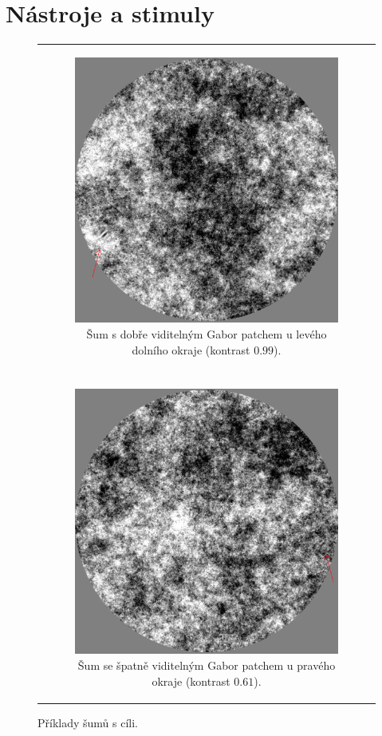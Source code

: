 \section{Nástroje a stimuly}
\begin{figure}
\centering
\begin{tabular}{c}
\begin{subfigure}{0.95\textwidth}
\centering
\includegraphics[width = .75\linewidth]{img/noise_visible}
\caption{Šum s dobře viditelným Gabor patchem u levého dolního okraje (kontrast $0.99$).}
\end{subfigure}\\
\noalign{\vskip\bigskipamount}
\\
\begin{subfigure}{0.95\textwidth}
\centering
\includegraphics[width = .75\linewidth]{img/noise_invisible}
\caption{Šum se špatně viditelným Gabor patchem u pravého okraje (kontrast $0.61$).}
\end{subfigure}
\end{tabular}
\caption{Příklady šumů s cíli.}
\label{Sumy}
\end{figure}

